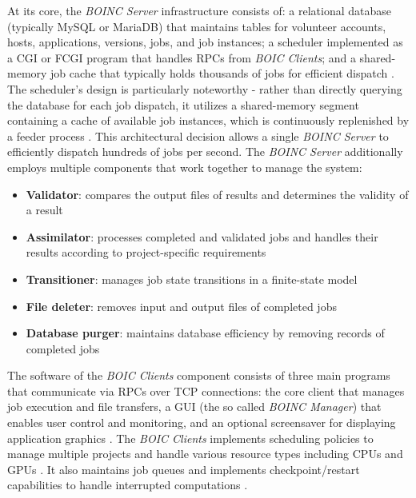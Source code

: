 At its core, the \emph{\ac{BOINC} Server} infrastructure consists of: a relational database (typically MySQL or MariaDB) that maintains tables for volunteer accounts, hosts, applications, versions, jobs, and job instances; a scheduler implemented as a \ac{CGI} or \ac{FCGI} program that handles \acs{RPC}s from \emph{\ac{BOIC} Clients}; and a shared-memory job cache that typically holds thousands of jobs for efficient dispatch \cite{relatedwork:boinc1}. The scheduler's design is particularly noteworthy - rather than directly querying the database for each job dispatch, it utilizes a shared-memory segment containing a cache of available job instances, which is continuously replenished by a feeder process \cite{relatedwork:boinc1}. This architectural decision allows a single \emph{\ac{BOINC} Server} to efficiently dispatch hundreds of jobs per second. The \emph{\ac{BOINC} Server} additionally employs multiple components that work together to manage the system:
\begin{itemize}
    \item \textbf{Validator}: compares the output files of results and determines the validity of a result
    \item \textbf{Assimilator}: processes completed and validated jobs and handles their results according to project-specific requirements
    \item \textbf{Transitioner}: manages job state transitions in a finite-state model
    \item \textbf{File deleter}: removes input and output files of completed jobs
    \item \textbf{Database purger}: maintains database efficiency by removing records of completed jobs
\end{itemize}

The software of the \emph{\ac{BOIC} Clients} component consists of three main programs that communicate via \acs{RPC}s over \acs{TCP} connections: the core client that manages job execution and file transfers, a \acs{GUI} (the so called \emph{\ac{BOINC} Manager}) that enables user control and monitoring, and an optional screensaver for displaying application graphics \cite{relatedwork:boinc1}. The \emph{\ac{BOIC} Clients} implements scheduling policies to manage multiple projects and handle various resource types including \acs{CPU}s and \acs{GPU}s \cite{relatedwork:boinc1}. It also maintains job queues and implements checkpoint/restart capabilities to handle interrupted computations \cite{relatedwork:boinc1}. 

